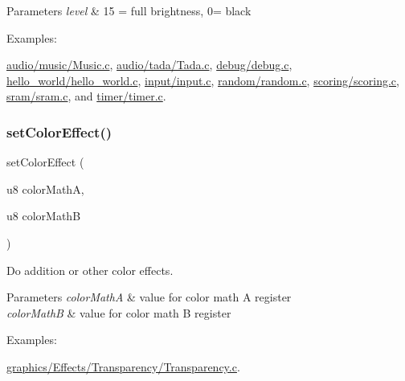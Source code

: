 \begin{DoxyParams}{Parameters}
{\em level} & 15 = full brightness, 0= black \\
\hline
\end{DoxyParams}
\begin{Desc}
\item[Examples\+: ]\par
\hyperlink{a00437}{audio/music/\+Music.\+c}, \hyperlink{a00439}{audio/tada/\+Tada.\+c}, \hyperlink{a00441}{debug/debug.\+c}, \hyperlink{a00403}{hello\+\_\+world/hello\+\_\+world.\+c}, \hyperlink{a00431}{input/input.\+c}, \hyperlink{a00443}{random/random.\+c}, \hyperlink{a00447}{scoring/scoring.\+c}, \hyperlink{a00445}{sram/sram.\+c}, and \hyperlink{a00433}{timer/timer.\+c}.\end{Desc}
\mbox{\label{a00368_a87d6cb8ec2433c908666a0a7f2306cb4}} 
\subsubsection{\texorpdfstring{set\+Color\+Effect()}{setColorEffect()}}
{\footnotesize\ttfamily set\+Color\+Effect (\begin{DoxyParamCaption}\item[{u8}]{color\+MathA,  }\item[{u8}]{color\+MathB }\end{DoxyParamCaption})}



Do addition or other color effects. 


\begin{DoxyParams}{Parameters}
{\em color\+MathA} & value for color math A register \\
\hline
{\em color\+MathB} & value for color math B register \\
\hline
\end{DoxyParams}
\begin{Desc}
\item[Examples\+: ]\par
\hyperlink{a00423}{graphics/\+Effects/\+Transparency/\+Transparency.\+c}.\end{Desc}
\mbox{\label{a00368_aedc79f1675778d0573d181fe22a0902d}} 
